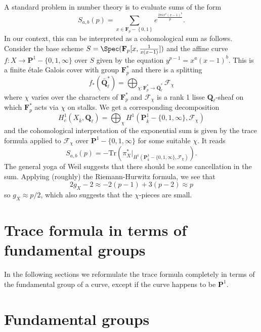 \noindent
A standard problem in number theory is to evaluate sums of the form
$$
S_{a, b}(p) = \sum_{x\in \mathbf{F}_p - \left\{0, 1\right\}} e^{\frac{2\pi
ix^a(x - 1)^b}{p}}.
$$
In our context, this can be interpreted as a cohomological sum as follows.
Consider the base scheme
$S = \Spec(\mathbf{F}_p[x, \frac{1}{x(x - 1)}])$ and the affine curve
$f : X \to \mathbf{P}^1-\{0, 1, \infty\}$ over $S$ given by the equation
$y^{p - 1} = x^a(x - 1)^b$. This is a finite \'etale Galois cover with group
$\mathbf{F}_p^*$ and there is a splitting
$$
f_*(\bar{\mathbf{Q}}_\ell^*) =
\bigoplus_{\chi : \mathbf{F}_p^*\to \bar{\mathbf{Q}}_\ell^*} \mathcal{F}_\chi
$$
where $\chi$ varies over the characters of $\mathbf{F}_p^*$ and
$\mathcal{F}_\chi$ is a rank 1 lisse $\mathbf{Q}_\ell$-sheaf on which
$\mathbf{F}_p^*$ acts via $\chi$ on stalks. We get a corresponding decomposition
$$
H_c^1(X_{\bar k}, \mathbf{Q}_\ell) = \bigoplus_\chi H^1(\mathbf{P}_{\bar
k}^1-\{0, 1, \infty\}, \mathcal{F}_\chi)
$$
and the cohomological interpretation of the exponential sum is given by the
trace formula applied to $\mathcal{F}_\chi$ over $\mathbf{P}^1 - \{0, 1,
\infty\}$ for some suitable $\chi$. It reads
$$
S_{a, b}(p) =
-\text{Tr}(\pi_X^*
|_{H^1(\mathbf{P}_{\bar k}^1-\{0, 1, \infty\}, \mathcal{F}_\chi)}).
$$
The general yoga of Weil suggests that there should be some cancellation in the
sum. Applying (roughly) the Riemann-Hurwitz formula, we see that
$$
2g_X-2 \approx -2 (p-1) + 3(p-2) \approx p
$$
so $g_X\approx p/2$, which also suggests that the $\chi$-pieces are small.



\section{Trace formula in terms of fundamental groups}
\label{section-trace-formula-fundamental-group}

\noindent
In the following sections we reformulate the trace formula completely
in terms of the fundamental group of a curve, except if the curve
happens to be $\mathbf{P}^1$.




\section{Fundamental groups}
\label{section-fundamental-groups}

